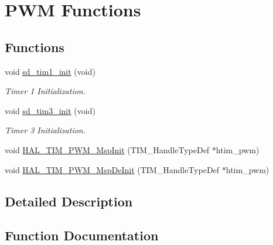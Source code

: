 \hypertarget{group___s_d___p_w_m___functions}{}\section{P\+WM Functions}
\label{group___s_d___p_w_m___functions}
\subsection*{Functions}
\begin{DoxyCompactItemize}
\item 
\mbox{\label{group___s_d___p_w_m___functions_ga60aa52b042f8f0dd0af4b31290239242}} 
void \mbox{\hyperlink{group___s_d___p_w_m___functions_ga60aa52b042f8f0dd0af4b31290239242}{sd\+\_\+tim1\+\_\+init}} (void)
\begin{DoxyCompactList}\small\item\em Timer 1 Initialization. \end{DoxyCompactList}\item 
\mbox{\label{group___s_d___p_w_m___functions_ga0dd6df2aa5533a54908ab2b4035511e1}} 
void \mbox{\hyperlink{group___s_d___p_w_m___functions_ga0dd6df2aa5533a54908ab2b4035511e1}{sd\+\_\+tim3\+\_\+init}} (void)
\begin{DoxyCompactList}\small\item\em Timer 3 Initialization. \end{DoxyCompactList}\item 
void \mbox{\hyperlink{group___s_d___p_w_m___functions_ga24d5b9c609d8b753d95508419f4c1901}{H\+A\+L\+\_\+\+T\+I\+M\+\_\+\+P\+W\+M\+\_\+\+Msp\+Init}} (T\+I\+M\+\_\+\+Handle\+Type\+Def $\ast$htim\+\_\+pwm)
\item 
void \mbox{\hyperlink{group___s_d___p_w_m___functions_gaf5f524564b3a99a9f87f45227309e866}{H\+A\+L\+\_\+\+T\+I\+M\+\_\+\+P\+W\+M\+\_\+\+Msp\+De\+Init}} (T\+I\+M\+\_\+\+Handle\+Type\+Def $\ast$htim\+\_\+pwm)
\end{DoxyCompactItemize}


\subsection{Detailed Description}


\subsection{Function Documentation}
\mbox{\label{group___s_d___p_w_m___functions_gaf5f524564b3a99a9f87f45227309e866}} 
